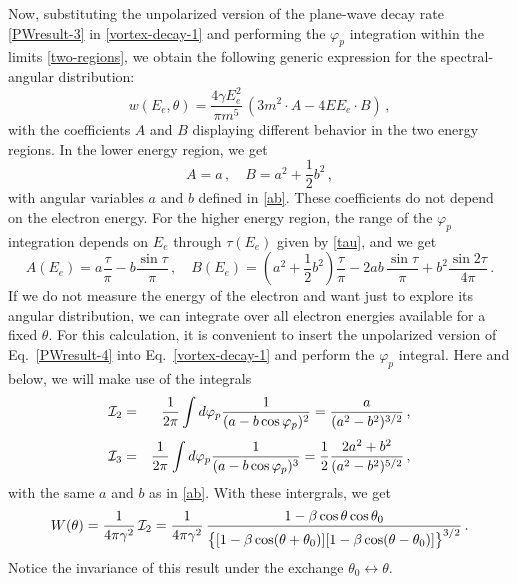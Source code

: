 \documentclass[aps,prd,longbibliography,nofootinbib,amsthm,amsmath,amssymb,amsfonts,notitlepage]{revtex4-1}
\begin{document}
Now, substituting the unpolarized version of the plane-wave decay rate \eqref{PWresult-3} in \eqref{vortex-decay-1} 
and performing the $\varphi_p$ integration within the limits \eqref{two-regions}, we obtain the 
following generic expression for the spectral-angular distribution:
	\begin{equation}
w(E_e, \theta) = \frac{4\gamma E_e^2 }{\pi m^5} \, (3m^2 \cdot A - 4 E E_e \cdot B)\,,
\end{equation}
with the coefficients $A$ and $B$ displaying different behavior in the two energy regions.
In the lower energy region, we get
\begin{equation}
A = a\,, \quad B = a^2 + \frac{1}{2}b^2\,,
\end{equation}
with angular variables $a$ and $b$ defined in \eqref{ab}. These coefficients do not depend on the electron energy. 
For the higher energy region, the range of the $\varphi_p$ integration depends on $E_e$ through
$\tau(E_e)$ given by \eqref{tau}, and we get
\begin{equation}
A(E_e) = a \frac{\tau}{\pi} - b\frac{\sin\tau}{\pi}\,, \quad
B(E_e)= \left(a^2 + \frac{1}{2}b^2\right)\frac{\tau}{\pi} - 2ab\, \frac{\sin\tau}{\pi} + b^2\frac{\sin2\tau}{4\pi}\,.
\end{equation}
If we do not measure the energy of the electron and want just to explore its angular distribution,
we can integrate over all electron energies available for a fixed $\theta$.
For this calculation, it is convenient to insert the unpolarized version of Eq.~\eqref{PWresult-4} into Eq.~\eqref{vortex-decay-1} and
perform the $\varphi_p$ integral.
Here and below, we will make use of the integrals
\begin{eqnarray}
{\cal I}_2 &=& \frac{1}{2\pi}\int d\varphi_p \frac{1}{(a - b\cos\varphi_p)^2} = \frac{a}{(a^2-b^2)^{3/2}}\,,\nonumber\\[1mm]
{\cal I}_3 &=& \frac{1}{2\pi}\int d\varphi_p \frac{1}{(a - b\cos\varphi_p)^3} = \frac{1}{2}\frac{2a^2+b^2}{(a^2-b^2)^{5/2}}\,, \label{integrals}
\end{eqnarray}
with the same $a$ and $b$ as in \eqref{ab}.
With these intergrals, we get
\begin{equation}
W(\theta) = 
\frac{1}{4\pi \gamma^2}\, {\cal I}_2 =
\frac{1}{4\pi\gamma^2}\,\frac {1 - \beta \cos\theta\cos\theta_0}{\bigl\{ [1 - \beta \cos(\theta+\theta_0)][1 - \beta \cos(\theta-\theta_0)]\bigr\}^{3/2}}\,.\label{vortex-result-2} 
\end{equation}
Notice the invariance of this result under the exchange $\theta_0 \leftrightarrow \theta$.
\end{document}
